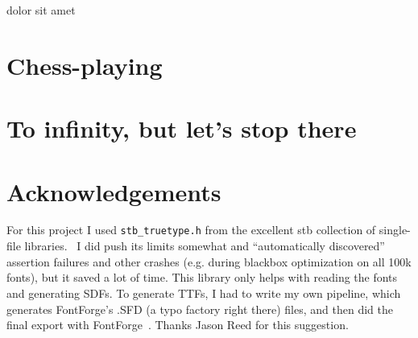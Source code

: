\documentclass[twocolumn]{article} %
\begin{document}


dolor sit amet

\section{Chess-playing}





\section{To infinity, but let's stop there}





\section{Acknowledgements}

For this project I used \verb+stb_truetype.h+ from the excellent stb
collection of single-file libraries.~\cite{stb} I did push its limits
somewhat and ``automatically discovered'' assertion failures and other
crashes (e.g. during blackbox optimization on all 100k fonts), but it
saved a lot of time. This library only helps with reading the fonts
and generating SDFs. To generate TTFs, I had to write my own pipeline,
which generates FontForge's .SFD (a typo factory right there) files,
and then did the final export with FontForge~\cite{fontforge}. Thanks
Jason Reed for this suggestion.


\nocite{murphy2019blind}
\nocite{murphy2019eloworld}
\nocite{stb}

{}

\end{document}

